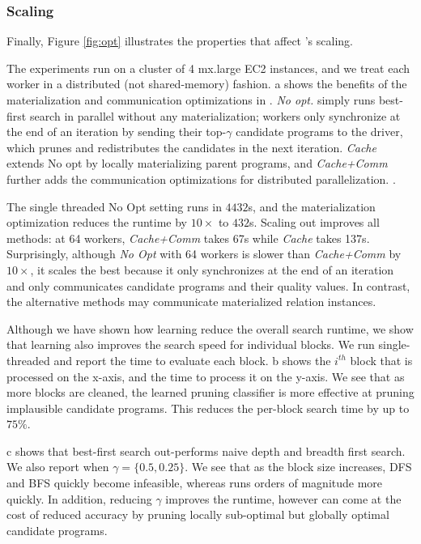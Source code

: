 \subsubsection{Scaling}
Finally, Figure \ref{fig:opt} illustrates the properties that affect \sys's scaling.  

 The experiments run on a cluster of 4 mx.large EC2 instances, and we treat each worker in a distributed (not shared-memory) fashion.   a shows the benefits of the materialization and communication optimizations in .  {\it No opt.} simply runs best-first search in parallel without any materialization; workers only synchronize at the end of an iteration by sending their top-$\gamma$ candidate programs to the driver, which prunes and redistributes the candidates in the next iteration.  {\it Cache} extends No opt by locally materializing parent programs, and {\it Cache+Comm} further adds the communication optimizations for distributed parallelization.   . 

The single threaded No Opt setting runs in $4432$s, and the materialization optimization reduces the runtime by $10\times$ to $432$s.   Scaling out improves all methods: at 64 workers, {\it Cache+Comm} takes 67s while {\it Cache} takes 137s.  Surprisingly, although {\it No Opt} with 64 workers is slower than {\it Cache+Comm} by $10\times$, it scales the best because it only synchronizes at the end of an iteration and only communicates candidate programs and their quality values.  In contrast, the alternative methods may communicate materialized relation instances.  

 Although we have shown how learning reduce the overall search runtime, we show that learning also improves the search speed for individual blocks.  We run single-threaded \sys and report the time to evaluate each block.  b shows the $i^{th}$ block that is processed on the x-axis, and the time to process it on the y-axis.   We see that as more blocks are cleaned, the learned pruning classifier is more effective at pruning implausible candidate programs.  This reduces the per-block search time by up to $75\%$.  

 c shows that best-first search out-performs naive depth and breadth first search.  We also report \sys when $\gamma=\{0.5, 0.25\}$.  We see that as the block size increases, DFS and BFS quickly become infeasible, whereas \sys runs orders of magnitude more quickly.  In addition, reducing $\gamma$ improves the runtime, however can come at the cost of reduced accuracy by pruning locally sub-optimal but globally optimal candidate programs.  

